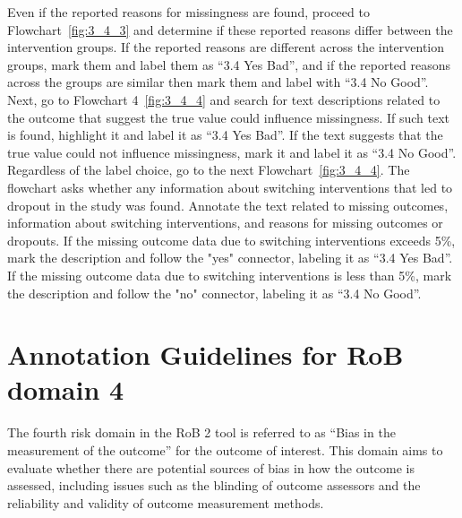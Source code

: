 \documentclass[sn-mathphys,Numbered]{sn-jnl}%
\begin{document}
Even if the reported reasons for missingness are found, proceed to Flowchart~\ref{fig:3_4_3} and determine if these reported reasons differ between the intervention groups.
If the reported reasons are different across the intervention groups, mark them and label them as ``3.4 Yes Bad'', and if the reported reasons across the groups are similar then mark them and label with ``3.4 No Good''.
Next, go to Flowchart 4~\ref{fig:3_4_4} and search for text descriptions related to the outcome that suggest the true value could influence missingness.
If such text is found, highlight it and label it as ``3.4 Yes Bad''.
If the text suggests that the true value could not influence missingness, mark it and label it as ``3.4 No Good''.
Regardless of the label choice, go to the next Flowchart~\ref{fig:3_4_4}.
The flowchart asks whether any information about switching interventions that led to dropout in the study was found.
Annotate the text related to missing outcomes, information about switching interventions, and reasons for missing outcomes or dropouts.
If the missing outcome data due to switching interventions exceeds 5\%, mark the description and follow the "yes" connector, labeling it as ``3.4 Yes Bad''.
If the missing outcome data due to switching interventions is less than 5\%, mark the description and follow the "no" connector, labeling it as ``3.4 No Good''.


%
%
%
\section*{Annotation Guidelines for RoB domain 4}
\label{sec:dom4}
%
The fourth risk domain in the RoB 2 tool is referred to as ``Bias in the measurement of the outcome'' for the outcome of interest.
This domain aims to evaluate whether there are potential sources of bias in how the outcome is assessed, including issues such as the blinding of outcome assessors and the reliability and validity of outcome measurement methods.
%
%
%
\end{document}
